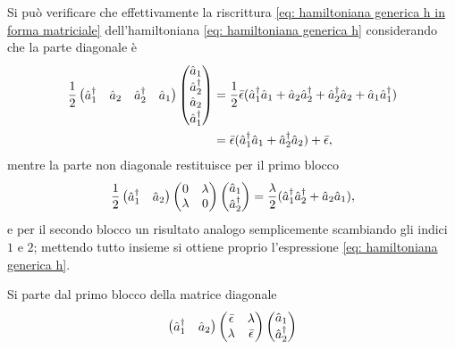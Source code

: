 \begin{obs}
    Si può verificare che effettivamente la riscrittura \eqref{eq: hamiltoniana generica h in forma matriciale} dell'hamiltoniana \eqref{eq: hamiltoniana generica h} considerando che la parte diagonale è
    \begin{equation}
        \begin{split}
            \frac{1}{2}
            \begin{pmatrix}
            \hat{a}^\dagger_1 & \hat{a}_2 & \hat{a}^\dagger_2 & \hat{a}_1
        \end{pmatrix}
        \begin{pmatrix}
            \hat{a}_1 \\
            \hat{a}^\dagger_2 \\
            \hat{a}_2 \\
            \hat{a}^\dagger_1
        \end{pmatrix} &= \frac{1}{2}\bar{\epsilon}(\hat{a}^\dagger_1\hat{a}_1 + \hat{a}_2\hat{a}^\dagger_2 + \hat{a}^\dagger_2\hat{a}_2 + \hat{a}_1\hat{a}^\dagger_1) \\
        &= \bar{\epsilon}(\hat{a}^\dagger_1\hat{a}_1 + \hat{a}^\dagger_2\hat{a}_2) + \bar{\epsilon},
        \end{split}
    \end{equation}
    mentre la parte non diagonale restituisce per il primo blocco
    \begin{equation}
        \frac{1}{2}
            \begin{pmatrix}
                \hat{a}^\dagger_1 & \hat{a}_2
            \end{pmatrix}
            \begin{pmatrix}
                0 & \lambda \\
                \lambda & 0
            \end{pmatrix}
            \begin{pmatrix}
                \hat{a}_1 \\
                \hat{a}^\dagger_2
            \end{pmatrix} = \frac{\lambda}{2}(\hat{a}^\dagger_1\hat{a}^\dagger_2 + \hat{a}_2\hat{a}_1),
    \end{equation}
    e per il secondo blocco un risultato analogo semplicemente scambiando gli indici $1$ e $2$; mettendo tutto insieme si ottiene proprio l'espressione \eqref{eq: hamiltoniana generica h}.
\end{obs}
Si parte dal primo blocco della matrice diagonale
\begin{equation}
    \begin{pmatrix}
        \hat{a}^\dagger_1 & \hat{a}_2
    \end{pmatrix}
    \begin{pmatrix}
        \bar{\epsilon} & \lambda \\
        \lambda & \bar{\epsilon}
    \end{pmatrix}
    \begin{pmatrix}
        \hat{a}_1 \\
        \hat{a}^\dagger_2
    \end{pmatrix}
\end{equation}
